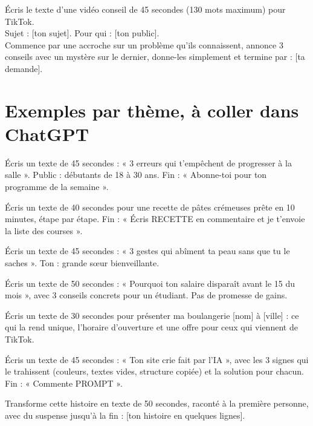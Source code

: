 \documentclass[11pt,oneside,openany]{book}
\begin{document}
\begin{acopier}
Écris le texte d'une vidéo conseil de 45 secondes (130 mots maximum) pour TikTok.\\
Sujet : [ton sujet]. Pour qui : [ton public].\\
Commence par une accroche sur un problème qu'ils connaissent, annonce 3 conseils avec un mystère sur le dernier, donne-les simplement et termine par : [ta demande].
\end{acopier}

\section{Exemples par thème, à coller dans ChatGPT}
\begin{acopier}[Sport]
Écris un texte de 45 secondes : « 3 erreurs qui t'empêchent de progresser à la salle ». Public : débutants de 18 à 30 ans. Fin : « Abonne-toi pour ton programme de la semaine ».
\end{acopier}
\begin{acopier}[Cuisine]
Écris un texte de 40 secondes pour une recette de pâtes crémeuses prête en 10 minutes, étape par étape. Fin : « Écris RECETTE en commentaire et je t'envoie la liste des courses ».
\end{acopier}
\begin{acopier}[Beauté]
Écris un texte de 45 secondes : « 3 gestes qui abîment ta peau sans que tu le saches ». Ton : grande sœur bienveillante.
\end{acopier}
\begin{acopier}[Argent]
Écris un texte de 50 secondes : « Pourquoi ton salaire disparaît avant le 15 du mois », avec 3 conseils concrets pour un étudiant. Pas de promesse de gains.
\end{acopier}
\begin{acopier}
Écris un texte de 30 secondes pour présenter ma boulangerie [nom] à [ville] : ce qui la rend unique, l'horaire d'ouverture et une offre pour ceux qui viennent de TikTok.
\end{acopier}
\begin{acopier}
Écris un texte de 45 secondes : « Ton site crie fait par l'IA », avec les 3 signes qui le trahissent (couleurs, textes vides, structure copiée) et la solution pour chacun. Fin : « Commente PROMPT ».
\end{acopier}
\begin{acopier}
Transforme cette histoire en texte de 50 secondes, raconté à la première personne, avec du suspense jusqu'à la fin : [ton histoire en quelques lignes].
\end{acopier}
\end{document}
